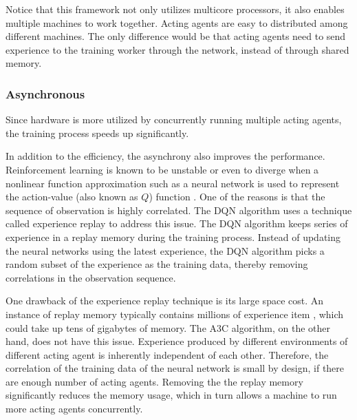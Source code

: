         Notice that this framework not only utilizes multicore processors,
        it also enables multiple machines to work together.
        Acting agents are easy to distributed among different machines.
        The only difference would be that acting agents need to send experience to the training worker
        through the network, instead of through shared memory.

        \subsubsection{Asynchronous}

            Since hardware is more utilized by concurrently running multiple acting agents,
            the training process speeds up significantly.

            In addition to the efficiency, the asynchrony also improves the performance.
            Reinforcement learning is known to be unstable or even to diverge
            when a nonlinear function approximation such as a neural network is used to represent the action-value
            (also known as $Q$) function \cite{tsitsiklis_analysis_1997}.
            One of the reasons is that the sequence of observation is highly correlated.
            The DQN algorithm uses a technique called experience replay to address this issue.
            The DQN algorithm keeps series of experience in a replay memory during the training process.
            Instead of updating the neural networks using the latest experience,
            the DQN algorithm picks a random subset of the experience as the training data,
            thereby removing correlations in the observation sequence.

            One drawback of the experience replay technique is its large space cost.
            An instance of replay memory typically contains millions of experience item \cite{mnih_human-level_2015},
            which could take up tens of gigabytes of memory.
            The A3C algorithm, on the other hand, does not have this issue.
            Experience produced by different environments of different acting agent
            is inherently independent of each other.
            Therefore, the correlation of the training data of the neural network is small by design,
            if there are enough number of acting agents.
            Removing the the replay memory significantly reduces the memory usage,
            which in turn allows a machine to run more acting agents concurrently.

